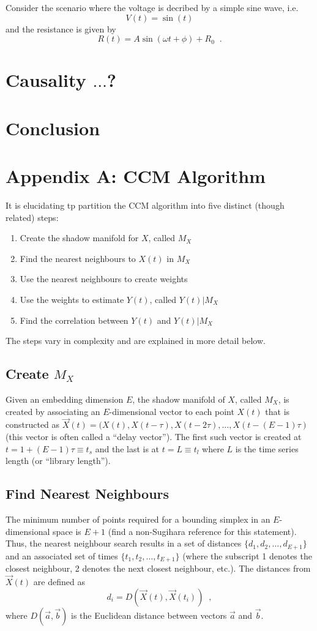 \documentclass[a4paper,11pt]{article}
\begin{document}
Consider the scenario where the voltage is decribed by a simple sine wave, i.e.\
\begin{equation}
V(t) = \sin(t)
\end{equation}
and the resistance is given by
\begin{equation}
R(t) = A\sin(\omega t + \phi) + R_0\;\;.
\end{equation}



\section{Causality $\ldots$?}
\section{Conclusion}
\section{Appendix A: CCM Algorithm}
\label{sec:appA}
It is elucidating tp partition the CCM algorithm into five distinct (though related) steps:
\begin{enumerate}
\item Create the shadow manifold for $X$, called $M_X$
\item Find the nearest neighbours to $X(t)$ in $M_X$
\item Use the nearest neighbours to create weights
\item Use the weights to estimate $Y(t)$, called $Y(t)|M_X$
\item Find the correlation between $Y(t)$ and $Y(t)|M_X$ 
\end{enumerate}
The steps vary in complexity and are explained in more detail below.

\subsection{Create $M_X$}
Given an embedding dimension $E$, the shadow manifold of $X$, called $M_X$, is created by associating an $E$-dimensional vector to each point $X(t)$ that is constructed as $\vec{X}(t)=(X(t),X(t-\tau),X(t-2\tau),\ldots,X(t-(E-1)\tau)$ (this vector is often called a ``delay vector'').  The first such vector is created at $t=1+(E-1)\tau\equiv t_s$ and the last is at $t=L\equiv t_l$ where $L$ is the time series length (or ``library length'').  

\subsection{Find Nearest Neighbours}
The minimum number of points required for a bounding simplex in an $E$-dimensional space is $E+1$ (find a non-Sugihara reference for this statement).  Thus, the nearest neighbour search results in a set of distances $\{d_1,d_2,\ldots,d_{E+1}\}$ and an associated set of times $\{t_1,t_2,\ldots,t_{E+1}\}$ (where the subscript 1 denotes the closest neighbour, 2 denotes the next closest neighbour, etc.).  The distances from $\vec{X}(t)$ are defined as
$$
d_i = D\left(\vec{X}(t),\vec{X}(t_i)\right)\;\;,
$$
where $D(\vec{a},\vec{b})$ is the Euclidean distance between vectors $\vec{a}$ and $\vec{b}$.
\end{document}
